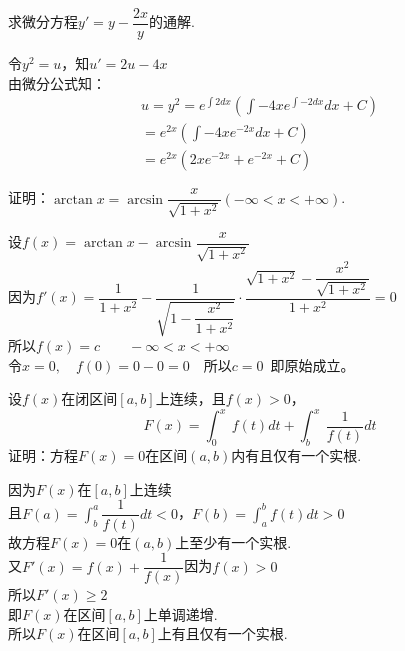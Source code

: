 \documentclass[prescorebox,sealed,cancelspace]{nwsuafexam}%
\begin{document}
\begin{questions}
		\question[10]
		求微分方程$y'=y-\dfrac{2x}{y}$的通解.
		\begin{Answers}
			令$y^2=u$，知$u'=2u-4x$\\
			由微分公式知：\begin{multline*}
				u=y^2=e^{\int 2dx}(\int-4xe^{\int -2dx}dx+C) \\
				=e^{2x}(\int-4xe^{-2x}dx+C) \\
				=e^{2x}(2xe^{-2x}+e^{-2x}+C)
			\end{multline*}
		\end{Answers}
		
		\question[10]
		证明：$\arctan x=\arcsin\dfrac{x}{\sqrt{1+x^2}}(-\infty<x<+\infty)$.
		\begin{Answers}
			设$f(x)=\arctan x-\arcsin \dfrac{x}{\sqrt{1+x^2}}$\\
			因为$f'(x)=\dfrac{1}{1+x^2}-\dfrac{1}{\sqrt{1-\dfrac{x^2}{1+x^2}}}\cdot\dfrac{\sqrt{1+x^2}-\dfrac{x^2}{\sqrt{1+x^2}}}{1+x^2}=0$\\
			所以$f(x)=c \qquad -\infty<x<+\infty$\\
			令$x=0,\quad f(0)=0-0=0 \quad\text{所以}c=0$~即原始成立。
		\end{Answers}
		
		\question[10]
		设$f(x)$在闭区间$[a,b]$上连续，且$f(x)>0$，\[
			F(x)=\int^x_0~f(t)dt+\int^x_b~\frac{1}{f(t)}dt
	    \]
	    证明：方程$F(x)=0\text{在区间}(a,b)$内有且仅有一个实根.
		\begin{Answers}
			因为$F(x)\text{在}[a,b]$上连续 \\
			且$F(a)=\int^a_b\dfrac{1}{f(t)}dt<0$，$F(b)=\int^b_af(t)dt>0$ \\
			故方程$F(x)=0\text{在}(a,b)$上至少有一个实根.\\
			又$F'(x)=f(x)+\dfrac{1}{f(x)}$\quad 因为$f(x)>0$\\
			所以$F'(x)\ge 2$\\
			即$F(x)\text{在区间}[a,b]$上单调递增.\\
			所以$F(x)\text{在区间}[a,b]$上有且仅有一个实根. 
		\end{Answers}
	\end{questions}
\end{document}

